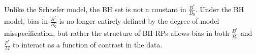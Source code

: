 %
Unlike the Schaefer model, the BH set is not a constant in
$\frac{B^*}{B_0}$. %
Under the BH model, bias in $\frac{B^*}{B_0}$ is no longer entirely defined by the degree of model 
misspecification, but rather the structure of BH RPs allows bias in both $\frac{B^*}{B_0}$ 
and $\frac{F^*}{M}$ to interact as a function of contrast in the data.



